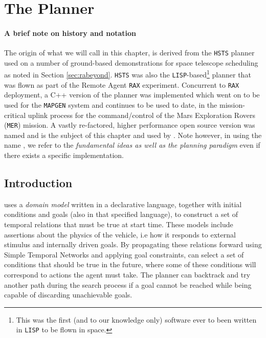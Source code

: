 \section{The \eu Planner }
\label{sec:basics}

\paragraph {A brief note on \eu history and notation} The origin of
what we will call \eu in this chapter, is derived from the
\texttt{HSTS} planner \cite{mus94} used on a number of ground-based
demonstrations for space telescope scheduling as noted in Section
\ref{sec:rabeyond}. \texttt{HSTS} was also the
\texttt{LISP}-based\footnote{This was the first (and to our knowledge
  only) software ever to been written in \texttt{LISP} to be flown in
  space.} planner that was flown as part of the Remote Agent
\texttt{RAX} experiment. Concurrent to \texttt{RAX} deployment, a C++
version of the planner was implemented which went on to be used for
the \texttt{MAPGEN} \cite{bresina05} system and continues to be used
to date, in the mission-critical uplink process for the
command/control of the Mars Exploration Rovers (\texttt{MER})
mission. A vastly re-factored, higher performance open source version
\cite{europapso} was named \eut and is the subject of this chapter and
used by \rx.  Note however, in using the name \eu, we refer to the
\emph{fundamental ideas as well as the planning paradigm} even if
there exists a specific implementation.

\subsection{Introduction}
\label{sec:euintro}

\eu uses a \emph{domain model} written in a declarative language,
together with initial conditions and goals (also in that specified
language), to construct a set of temporal relations that must be true
at start time. These models include assertions about the physics of
the vehicle, i.e how it responds to external stimulus and internally
driven goals. By propagating these relations forward using Simple
Temporal Networks \cite{dechter91} and applying goal constraints, \eu
can select a set of conditions that should be true in the future,
where some of these conditions will correspond to actions the agent
must take. The planner can backtrack and try another path during the
search process if a goal cannot be reached while being capable of
discarding unachievable goals.

